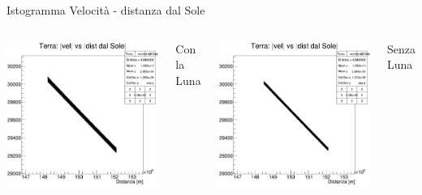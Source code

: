         \begin{frame}{Istogramma Velocità - distanza dal Sole}
            \begin{columns}
                    \centering
                    \includegraphics[width=.9\textwidth]{5_distanza/terra_vdds_luna.jpg}
                    \caption{Con la Luna}
                    \centering
                    \includegraphics[width=.9\textwidth]{5_distanza/terra_vds_noluna.jpg}
                    \caption{Senza Luna}
            \end{columns}
        \end{frame}
